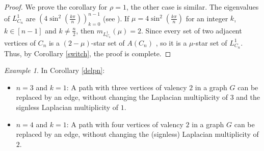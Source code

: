 \documentclass{amsart}
\theoremstyle{remark}
\newtheorem{example}[theorem]{Example}
\begin{document}
\begin{proof}
We prove the corollary for $\rho=1$, the other case is similar. The eigenvalues of $L_{C_{n}}^{1}$ are $(4{\sin^{2}(\frac{k\pi}{n})})_{k=0}^{n-1}$ {\rm(}see \cite{Sp}{\rm)}. If $\mu=4{\sin^{2}(\frac{k\pi}{n})}$ for an integer $k$, $k\in [n-1]$ and $k\neq \frac{n}{2}$, then $m_{L_{C_{n}}^{1}}(\mu)=2$. Since every set of two adjacent vertices of $C_{n}$ is a $(2-\mu)$-star set of $A(C_{n})$ \cite{BK}, so it is a $\mu$-star set of $L_{C_{n}}^{1}$. Thus, by Corollary \ref{switch}, the proof is complete.
\end{proof}


\begin{example}In Corollary \ref{delpn}:
\begin{itemize}
\item
$n=3$ and $k=1$: A path with three vertices of valency $2$ in a graph $G$ can be replaced by an edge, without changing the Laplacian multiplicity of $3$ and the signless Laplacian multiplicity of $1$.
\item
$n=4$ and $k=1$: A path with four vertices of valency $2$ in a graph $G$ can be replaced by an edge, without changing the (signless) Laplacian multiplicity of $2$.
\end{itemize}
\end{example}
\end{document}
